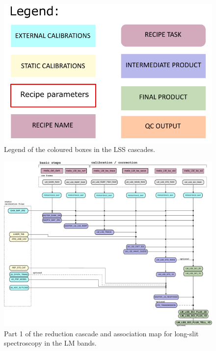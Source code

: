 \begin{figure}[ht]
  \centering
  \includegraphics[width=0.4\textheight]{figures/legend.pdf}
  \caption[Legend]{Legend of the coloured boxes in the \ac{LSS} cascades.}
  \label{Fig:LSScascadelegend}
\end{figure}
\clearpage


\begin{landscape}
\begin{figure}[ht]
  \centering
  \includegraphics{figures/LM_LSS_pipeline_wf_draft_latest_part_1_v0.82.pdf}
  \caption[Reduction cascade and association map for LM long-slit
  spectroscopy]{Part 1 of the reduction cascade and association map for long-slit
    spectroscopy in the LM bands.}
  \label{Fig:LMLssAssomap1}
\end{figure}
\end{landscape}

